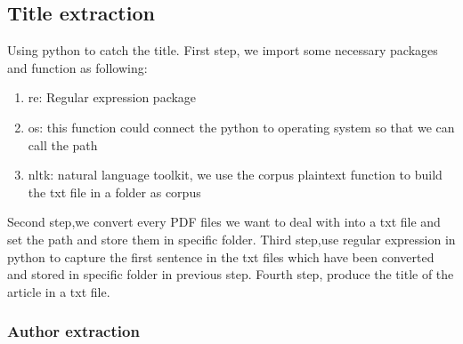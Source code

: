 	
\subsection*{Title extraction}
Using python to catch the title. First step, we import some necessary packages and function as following:
\begin{enumerate}
	\item re: Regular expression package
	\item os: this function could connect the python to operating system so that we can call the path
	\item nltk: natural language toolkit, we use the corpus plaintext function to build the txt file in a folder as corpus
\end{enumerate}  
Second step,we convert every PDF files we want to deal with into a txt file and set the path and store them in specific folder.
Third step,use regular expression in python to capture the first sentence in the txt files which have been converted and stored in specific folder in previous step. 
Fourth step, produce the title of the article in a txt file.   

\subsubsection*{Author extraction}


